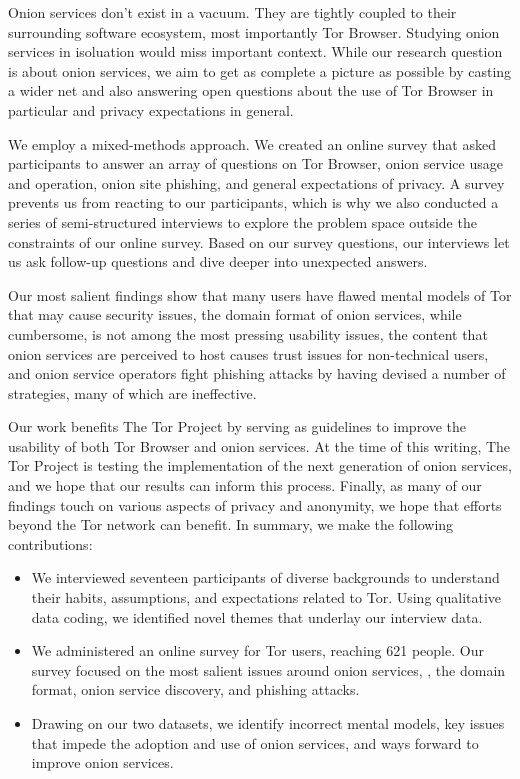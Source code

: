 Onion services don't exist in a vacuum.  They are tightly coupled to their
surrounding software ecosystem, most importantly Tor Browser.  Studying onion
services in isoluation would miss important context.  While our research
question is about onion services, we aim to get as complete a picture as
possible by casting a wider net and also answering open questions about the use
of Tor Browser in particular and privacy expectations in general.

We employ a mixed-methods approach.  We created an online survey that asked
participants to answer an array of questions on Tor Browser, onion service usage
and operation, onion site phishing, and general expectations of privacy.  A
survey prevents us from reacting to our participants, which is why we also
conducted a series of semi-structured interviews to explore the problem space
outside the constraints of our online survey.  Based on our survey questions,
our interviews let us ask follow-up questions and dive deeper into unexpected
answers.

Our most salient findings show that \first many users have flawed mental models
of Tor that may cause security issues, \second the domain format of onion
services, while cumbersome, is not among the most pressing usability issues,
\third the content that onion services are perceived to host causes trust issues
for non-technical users, and \fourth onion service operators fight phishing
attacks by having devised a number of strategies, many of which are ineffective.

Our work benefits The Tor Project by serving as guidelines to improve the
usability of both Tor Browser and onion services.  At the time of this writing,
The Tor Project is testing the implementation of the next generation of onion
services, and we hope that our results can inform this process.  Finally, as
many of our findings touch on various aspects of privacy and anonymity, we hope
that efforts beyond the Tor network can benefit.  In summary, we make the
following contributions:

\begin{itemize}
    \item We interviewed seventeen participants of diverse backgrounds to
        understand their habits, assumptions, and expectations related to Tor.
        Using qualitative data coding, we identified novel themes that underlay
        our interview data.

    \item We administered an online survey for Tor users, reaching 621 people.
        Our survey focused on the most salient issues around onion services,
        \eg, the domain format, onion service discovery, and phishing attacks.

    \item Drawing on our two datasets, we identify \first incorrect mental
        models, \second key issues that impede the adoption and use of onion
        services, and \third ways forward to improve onion services.
\end{itemize}

